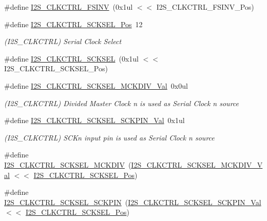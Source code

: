 \begin{DoxyCompactItemize}
\#define \mbox{\hyperlink{group___s_a_m_d21___i2_s_gaa289e9c50933115f514d05a6894d7ae7}{I2\+S\+\_\+\+C\+L\+K\+C\+T\+R\+L\+\_\+\+F\+S\+I\+NV}}~(0x1ul $<$$<$ I2\+S\+\_\+\+C\+L\+K\+C\+T\+R\+L\+\_\+\+F\+S\+I\+N\+V\+\_\+\+Pos)
\item 
\#define \mbox{\hyperlink{group___s_a_m_d21___i2_s_ga51d7bf9feb1a438c178c07077a84d6ec}{I2\+S\+\_\+\+C\+L\+K\+C\+T\+R\+L\+\_\+\+S\+C\+K\+S\+E\+L\+\_\+\+Pos}}~12
\begin{DoxyCompactList}\small\item\em (I2\+S\+\_\+\+C\+L\+K\+C\+T\+RL) Serial Clock Select \end{DoxyCompactList}\item 
\#define \mbox{\hyperlink{group___s_a_m_d21___i2_s_ga9be30940834f5b7858c437b644d26159}{I2\+S\+\_\+\+C\+L\+K\+C\+T\+R\+L\+\_\+\+S\+C\+K\+S\+EL}}~(0x1ul $<$$<$ I2\+S\+\_\+\+C\+L\+K\+C\+T\+R\+L\+\_\+\+S\+C\+K\+S\+E\+L\+\_\+\+Pos)
\item 
\#define \mbox{\hyperlink{group___s_a_m_d21___i2_s_ga4fcee5b58df1d5d62935da463555752d}{I2\+S\+\_\+\+C\+L\+K\+C\+T\+R\+L\+\_\+\+S\+C\+K\+S\+E\+L\+\_\+\+M\+C\+K\+D\+I\+V\+\_\+\+Val}}~0x0ul
\begin{DoxyCompactList}\small\item\em (I2\+S\+\_\+\+C\+L\+K\+C\+T\+RL) Divided Master Clock n is used as Serial Clock n source \end{DoxyCompactList}\item 
\#define \mbox{\hyperlink{group___s_a_m_d21___i2_s_gaf4b508014f15cb047bddbb681228668f}{I2\+S\+\_\+\+C\+L\+K\+C\+T\+R\+L\+\_\+\+S\+C\+K\+S\+E\+L\+\_\+\+S\+C\+K\+P\+I\+N\+\_\+\+Val}}~0x1ul
\begin{DoxyCompactList}\small\item\em (I2\+S\+\_\+\+C\+L\+K\+C\+T\+RL) S\+C\+Kn input pin is used as Serial Clock n source \end{DoxyCompactList}\item 
\#define \mbox{\hyperlink{group___s_a_m_d21___i2_s_gaf2f686a8e9ac7e64f31506d5e90915cf}{I2\+S\+\_\+\+C\+L\+K\+C\+T\+R\+L\+\_\+\+S\+C\+K\+S\+E\+L\+\_\+\+M\+C\+K\+D\+IV}}~(\mbox{\hyperlink{group___s_a_m_d21___i2_s_ga4fcee5b58df1d5d62935da463555752d}{I2\+S\+\_\+\+C\+L\+K\+C\+T\+R\+L\+\_\+\+S\+C\+K\+S\+E\+L\+\_\+\+M\+C\+K\+D\+I\+V\+\_\+\+Val}} $<$$<$ \mbox{\hyperlink{group___s_a_m_d21___i2_s_ga51d7bf9feb1a438c178c07077a84d6ec}{I2\+S\+\_\+\+C\+L\+K\+C\+T\+R\+L\+\_\+\+S\+C\+K\+S\+E\+L\+\_\+\+Pos}})
\item 
\#define \mbox{\hyperlink{group___s_a_m_d21___i2_s_ga95d25d13e6a5887b87653460069a0faf}{I2\+S\+\_\+\+C\+L\+K\+C\+T\+R\+L\+\_\+\+S\+C\+K\+S\+E\+L\+\_\+\+S\+C\+K\+P\+IN}}~(\mbox{\hyperlink{group___s_a_m_d21___i2_s_gaf4b508014f15cb047bddbb681228668f}{I2\+S\+\_\+\+C\+L\+K\+C\+T\+R\+L\+\_\+\+S\+C\+K\+S\+E\+L\+\_\+\+S\+C\+K\+P\+I\+N\+\_\+\+Val}} $<$$<$ \mbox{\hyperlink{group___s_a_m_d21___i2_s_ga51d7bf9feb1a438c178c07077a84d6ec}{I2\+S\+\_\+\+C\+L\+K\+C\+T\+R\+L\+\_\+\+S\+C\+K\+S\+E\+L\+\_\+\+Pos}})

\end{DoxyCompactItemize}
